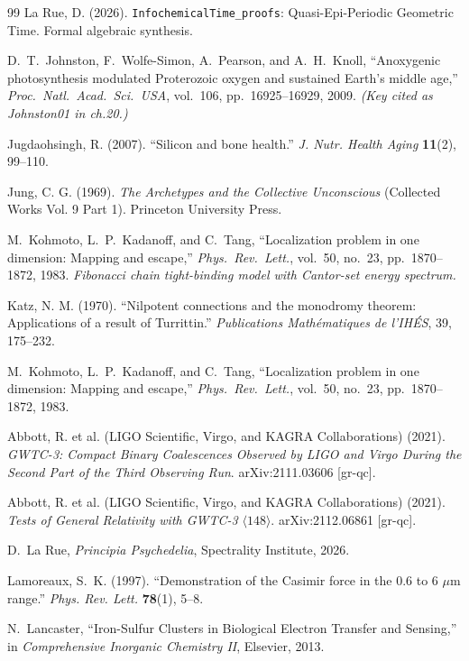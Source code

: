 \documentclass[12pt,oneside]{book}
\theoremstyle{principia}
\theoremstyle{definition}
\theoremstyle{remark}
\begin{document}
\begin{thebibliography}{99}
La Rue, D. (2026).
\texttt{InfochemicalTime\_proofs}: Quasi-Epi-Periodic Geometric Time.
Formal algebraic synthesis.

D.~T.~Johnston, F.~Wolfe-Simon, A.~Pearson, and A.~H.~Knoll,
``Anoxygenic photosynthesis modulated Proterozoic oxygen and sustained Earth's middle age,''
\emph{Proc.\ Natl.\ Acad.\ Sci.\ USA}, vol.~106, pp.~16925--16929, 2009.
\textit{(Key cited as Johnston01 in ch.20.)}

Jugdaohsingh, R. (2007).
``Silicon and bone health.''
\textit{J. Nutr. Health Aging} \textbf{11}(2), 99--110.

Jung, C. G. (1969).
\textit{The Archetypes and the Collective Unconscious} (Collected Works Vol. 9 Part 1).
Princeton University Press.

M.~Kohmoto, L.~P.~Kadanoff, and C.~Tang,
``Localization problem in one dimension: Mapping and escape,''
\emph{Phys.\ Rev.\ Lett.}, vol.~50, no.~23, pp.~1870--1872, 1983.
\textit{Fibonacci chain tight-binding model with Cantor-set energy spectrum.}

Katz, N. M. (1970).
``Nilpotent connections and the monodromy theorem: Applications of a result of Turrittin.''
\textit{Publications Mathématiques de l'IHÉS}, 39, 175--232.

M.~Kohmoto, L.~P.~Kadanoff, and C.~Tang,
``Localization problem in one dimension: Mapping and escape,''
\emph{Phys.\ Rev.\ Lett.}, vol.~50, no.~23, pp.~1870--1872, 1983.

Abbott, R. et al. (LIGO Scientific, Virgo, and KAGRA Collaborations) (2021).
\textit{GWTC-3: Compact Binary Coalescences Observed by LIGO and Virgo During the Second Part of the Third Observing Run}.
arXiv:2111.03606 [gr-qc].

Abbott, R. et al. (LIGO Scientific, Virgo, and KAGRA Collaborations) (2021).
\textit{Tests of General Relativity with GWTC-3} $\langle 148 \rangle$.
arXiv:2112.06861 [gr-qc].

D.~La Rue,
\emph{Principia Psychedelia},
Spectrality Institute, 2026.

Lamoreaux, S.~K. (1997).
``Demonstration of the Casimir force in the 0.6 to 6 $\mu$m range.''
\textit{Phys. Rev. Lett.} \textbf{78}(1), 5--8.

N.~Lancaster,
``Iron-Sulfur Clusters in Biological Electron Transfer and Sensing,''
in \emph{Comprehensive Inorganic Chemistry II}, Elsevier, 2013.


\end{thebibliography}
\end{document}
